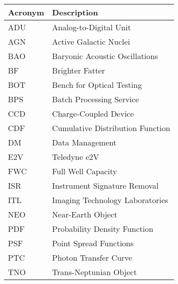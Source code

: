 \addtocounter{table}{-1}
\begin{longtable}{p{}p{}}\hline
\textbf{Acronym} & \textbf{Description}  \\\hline
ADU & Analog-to-Digital Unit    \\
AGN & Active Galactic Nuclei    \\
BAO & Baryonic Acoustic Oscillations    \\
BF & Brighter Fatter    \\
BOT & Bench for Optical Testing    \\
BPS & Batch Processing Service    \\
CCD & Charge-Coupled Device    \\
CDF & Cumulative Distribution Function    \\
DM & Data Management    \\
E2V & Teledyne e2V    \\
FWC & Full Well Capacity    \\
ISR & Instrument Signature Removal    \\
ITL & Imaging Technology Laboratories    \\
NEO & Near-Earth Object    \\
PDF & Probability Density Function    \\
PSF & Point Spread Functions    \\
PTC & Photon Transfer Curve    \\
TNO & Trans-Neptunian Object    \\
\hline
\end{longtable}
